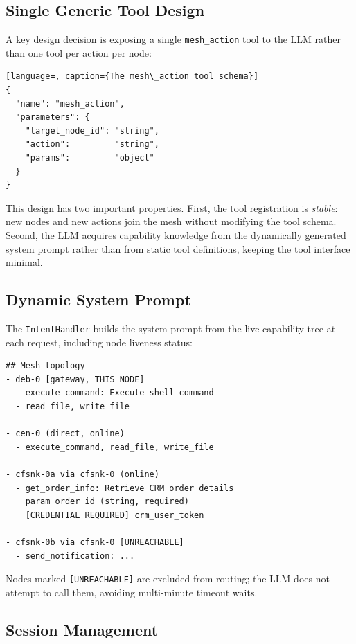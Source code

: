 \documentclass[10pt,twocolumn]{article}
\begin{document}
\subsection{Single Generic Tool Design}

A key design decision is exposing a single \texttt{mesh\_action} tool
to the LLM rather than one tool per action per node:

\begin{lstlisting}[language=, caption={The mesh\_action tool schema}]
{
  "name": "mesh_action",
  "parameters": {
    "target_node_id": "string",
    "action":         "string",
    "params":         "object"
  }
}
\end{lstlisting}

This design has two important properties. First, the tool registration
is \emph{stable}: new nodes and new actions join the mesh without
modifying the tool schema. Second, the LLM acquires capability knowledge
from the dynamically generated system prompt rather than from static
tool definitions, keeping the tool interface minimal.

\subsection{Dynamic System Prompt}

The \texttt{IntentHandler} builds the system prompt from the live
capability tree at each request, including node liveness status:

\begin{lstlisting}[caption={Excerpt of generated system prompt}]
## Mesh topology
- deb-0 [gateway, THIS NODE]
  - execute_command: Execute shell command
  - read_file, write_file

- cen-0 (direct, online)
  - execute_command, read_file, write_file

- cfsnk-0a via cfsnk-0 (online)
  - get_order_info: Retrieve CRM order details
    param order_id (string, required)
    [CREDENTIAL REQUIRED] crm_user_token

- cfsnk-0b via cfsnk-0 [UNREACHABLE]
  - send_notification: ...
\end{lstlisting}

Nodes marked \texttt{[UNREACHABLE]} are excluded from routing; the LLM
does not attempt to call them, avoiding multi-minute timeout waits.

\subsection{Session Management}
\end{document}
